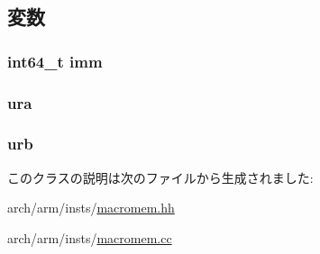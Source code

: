 \subsection{変数}
\hypertarget{classArmISA_1_1MicroIntImmXOp_a11b34c3ceec32cc1f14d0ca9c099c470}{
\subsubsection[{imm}]{\setlength{\rightskip}{0pt plus 5cm}int64\_\-t {\bf imm}}}
\label{classArmISA_1_1MicroIntImmXOp_a11b34c3ceec32cc1f14d0ca9c099c470}
\hypertarget{classArmISA_1_1MicroIntImmXOp_a8e6cd3e234a4950e7a1a05f1b24cfee0}{
\subsubsection[{ura}]{ {\bf ura}}}
\label{classArmISA_1_1MicroIntImmXOp_a8e6cd3e234a4950e7a1a05f1b24cfee0}
\hypertarget{classArmISA_1_1MicroIntImmXOp_a3771d4e6da84a09dbf436d6b1af2be46}{
\subsubsection[{urb}]{ {\bf urb}}}
\label{classArmISA_1_1MicroIntImmXOp_a3771d4e6da84a09dbf436d6b1af2be46}


このクラスの説明は次のファイルから生成されました:\begin{DoxyCompactItemize}
\item 
arch/arm/insts/\hyperlink{macromem_8hh}{macromem.hh}\item 
arch/arm/insts/\hyperlink{macromem_8cc}{macromem.cc}\end{DoxyCompactItemize}
